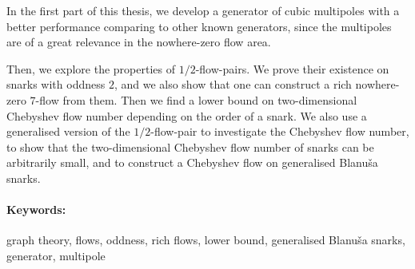 \documentclass[12pt, oneside]{book}  %
\theoremstyle{definition}
\theoremstyle{definition}
\theoremstyle{remark}
\begin{document}
In the first part of this thesis, we develop a generator of cubic multipoles with a better performance comparing to other known generators, since the multipoles are of a great relevance in the nowhere-zero flow area.

Then, we explore the properties of $1/2$-flow-pairs. We prove their existence on snarks with oddness $2$, and we also show that one can construct a rich nowhere-zero $7$-flow from them. Then we find a lower bound on two-dimensional Chebyshev flow number depending on the order of a snark. We also use a generalised version of the $1/2$-flow-pair to investigate the Chebyshev flow number, to show that the two-dimensional Chebyshev flow number of snarks can be arbitrarily small, and to construct a Chebyshev flow on generalised Blanu{\v s}a snarks.


\paragraph*{Keywords:} graph theory, flows, oddness, rich flows, lower bound, generalised Blanu{\v s}a snarks, generator, multipole


%
%
%
%



\cleardoublepage

\tableofcontents





\end{document}
